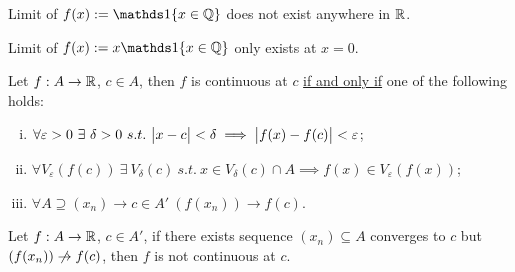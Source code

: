 \documentclass[11pt]{article}
\begin{document}
	\begin{example}
		Limit of $f(x) := \id{x \in \Q}$ does not exist anywhere in $\mathbb{R}$.
	\end{example}
	
	\begin{example}
		Limit of $f(x) := x \id{x \in \Q}$ only exists at $x = 0$.
	\end{example}
	
	\begin{theorem}
		Let $f: A \to \mathbb{R}$, $c \in A$, then $f$ is continuous at $c$ \ul{if and only if} one of the following holds:
		\begin{enumerate}[(i)]
			\item $\forall \varepsilon > 0\ \exists\ \delta > 0\ s.t.\ \abs{x - c} < \delta \implies \abs{f(x) - f(c)} < \varepsilon$;
			\item $\forall V_\varepsilon(f(c))\ \exists\  V_\delta(c)\ s.t.\ x \in V_\delta (c) \cap A \implies f(x) \in V_\varepsilon (f(x))$;
			\item $\forall A \supseteq (x_n) \to c \in A'\ (f(x_n)) \to f(c)$.
		\end{enumerate}
	\end{theorem}
	
	\begin{theorem}
		Let $f: A \to \mathbb{R}$, $c \in A'$, if there exists sequence $(x_n) \subseteq A$ converges to $c$ but $(f(x_n)) \centernot \to f(c)$, then $f$ is not continuous at $c$.
	\end{theorem}
	
\end{document}
